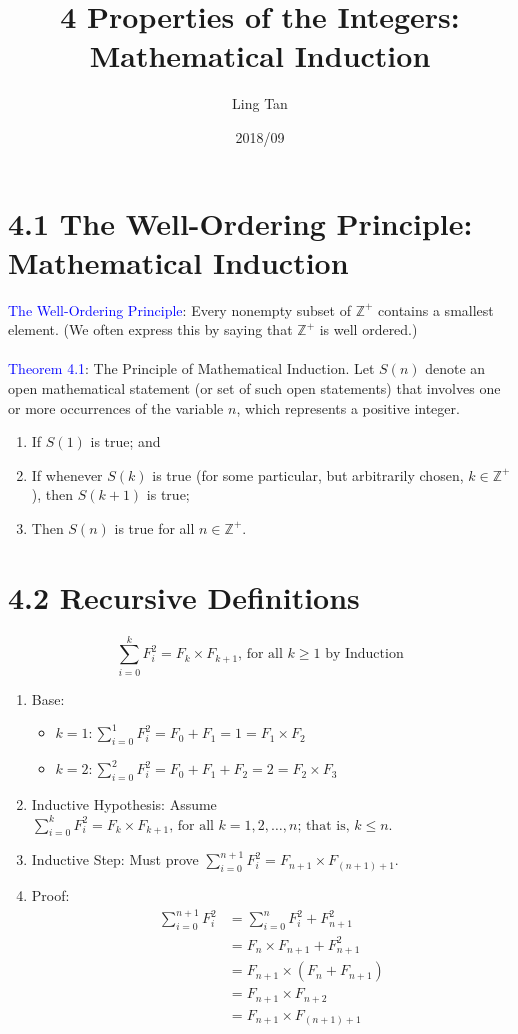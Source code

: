 \documentclass[letter]{book}
\title{4 Properties of the Integers: Mathematical Induction}
\author{Ling Tan}
\date{2018/09}
\begin{document}
\maketitle

\section*{4.1 The Well-Ordering Principle: Mathematical Induction}
\textcolor{blue}{The Well-Ordering Principle}: Every nonempty subset of $\mathbb{Z}^+$ contains a smallest element. (We often express this by saying that $\mathbb{Z}^+$ is well ordered.)\\
\\
\textcolor{blue}{Theorem 4.1}: The Principle of Mathematical Induction. Let $S(n)$ denote an open mathematical statement (or set of such open statements) that involves one or more occurrences of the variable $n$, which represents a positive integer.
\begin{enumerate}
    \item If $S(1)$ is true; and
    \item If whenever $S(k)$ is true (for some particular, but arbitrarily chosen, $k\in\mathbb{Z}^+$), then $S(k+1)$ is true;
    \item Then $S(n)$ is true for all $n\in\mathbb{Z}^+$.
\end{enumerate}

\section*{4.2 Recursive Definitions}
$$
\sum_{i=0}^k F_i^2=F_k\times F_{k+1}\text{, for all }k\geq1\text{ by Induction}
$$
\begin{enumerate}
    \item Base:
    \begin{itemize}
        \item $k=1: \sum_{i=0}^1 F_i^2=F_0+F_1=1=F_1\times F_2$
        \item $k=2: \sum_{i=0}^2 F_i^2=F_0+F_1+F_2=2=F_2\times F_3$
    \end{itemize}
    \item Inductive Hypothesis: Assume $\sum_{i=0}^k F_i^2=F_k\times F_{k+1}\text{, for all }k=1,2,\dots,n\text{; that is, }k\leq n$.
    \item Inductive Step: Must prove $\sum_{i=0}^{n+1} F_i^2=F_{n+1}\times F_{(n+1)+1}$.
    \item Proof:\\
    \begin{align*}
    \sum_{i=0}^{n+1} F_i^2 & = \sum_{i=0}^{n} F_i^2 + F_{n+1}^2 \\
    & = F_n\times F_{n+1} + F_{n+1}^2 \\ 
    & = F_{n+1}\times (F_n+F_{n+1}) \\ 
    & = F_{n+1}\times F_{n+2} \\ 
    & = F_{n+1}\times F_{(n+1)+1}
    \end{align*}
\end{enumerate}
\end{document}
